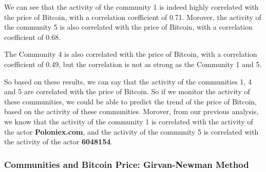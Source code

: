 \documentclass[a4paper, 12pt]{article}
\begin{document}
\begin{table}[!h]
    \begin{minipage}{0.35\linewidth}
        \centering
        \label{tab:louvain_correlation_matrix_btc}
        \caption{Correlation BTC / Community}
    \end{minipage}%
    \hspace{0.05\linewidth} %
    \begin{minipage}{0.60\linewidth}
        We can see that the activity of the community 1 is indeed highly correlated with the price of Bitcoin,
        with a correlation coefficient of 0.71. Morover, the activity of the community 5 is also correlated with the price of Bitcoin,
        with a correlation coefficient of 0.68.

        The Community 4 is also correlated with the price of Bitcoin, with a correlation coefficient of 0.49, but the correlation is not as strong as the Community 1 and 5. \\
    \end{minipage}
\end{table}

So based on these results, we can say that the activity of the communities 1, 4 and 5 are correlated with the price of Bitcoin. 
So if we monitor the activity of these communities, we could be able to predict the trend of the price of Bitcoin, 
based on the activity of these communities. Morover, from our previous analysis, 
we know that the activity of the community 1 is correlated with the activity of the actor \textbf{Poloniex.com}, 
and the activity of the community 5 is correlated with the activity of the actor \textbf{6048154}. 

\newpage

\subsubsection{Communities and Bitcoin Price: Girvan-Newman Method}
\end{document}
